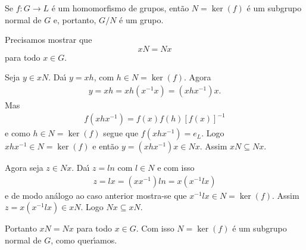 \begin{lema}
    Se $f : G \to L$ \'e um homomorfismo de grupos, ent\~ao $N = \ker(f)$ \'e um subgrupo normal de $G$ e, portanto, $G/N$ \'e um grupo.
\end{lema}
\begin{prova}
    Precisamos mostrar que
    \[
        xN = Nx
    \]
    para todo $x \in G$.

    Seja $y \in xN$. Da{\'\i} $y = xh$, com $h \in N = \ker(f)$. Agora
    \begin{align*}
        y = xh = xh(x^{-1}x) = (xhx^{-1})x.
    \end{align*}
    Mas
    \begin{align*}
        f(xhx^{-1}) = f(x)f(h)[f(x)]^{-1}
    \end{align*}
    e como $h \in N = \ker(f)$ segue que $f(xhx^{-1}) = e_L$. Logo $xhx^{-1} \in N = \ker(f)$ e ent\~ao $y = (xhx^{-1})x \in Nx$. Assim $xN \subseteq Nx$.

    Agora seja $z \in Nx$. Da{\'\i} $z = ln$ com $l \in N$ e com isso
    \begin{align*}
        z = lx = (xx^{-1})ln = x(x^{-1}lx)
    \end{align*}
    e de modo an\'alogo ao caso anterior mostra-se que $x^{-1}lx \in N = \ker(f)$. Assim $z = x(x^{-1}lx) \in xN$. Logo $Nx \subseteq xN$.

    Portanto $xN = Nx$ para todo $x \in G$. Com isso $N = \ker(f)$ \'e um subgrupo normal de $G$, como quer{\'\i}amos.
\end{prova}

